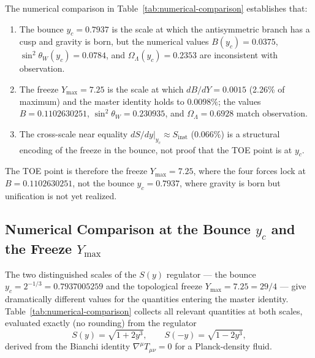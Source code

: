 \documentclass[a4paper,1pt,oneside,openany]{book}
\begin{document}
The numerical comparison in Table~\ref{tab:numerical-comparison} establishes that:
\begin{enumerate}
\item The bounce $y_c = 0.7937$ is the scale at which the antisymmetric branch has a cusp and gravity is born, but the numerical values $B(y_c) = 0.0375$, $\sin^2\theta_W(y_c) = 0.0784$, and $\Omega_\Lambda(y_c) = 0.2353$ are inconsistent with observation.
\item The freeze $Y_{\max} = 7.25$ is the scale at which $dB/dY = 0.0015$ (2.26\% of maximum) and the master identity holds to $0.0098\%$; the values $B = 0.1102630251$, $\sin^2\theta_W = 0.230935$, and $\Omega_\Lambda = 0.6928$ match observation.
\item The cross-scale near equality $dS/dy|_{y_c} \approx S_{\mathrm{inst}}$ (0.066\%) is a structural encoding of the freeze in the bounce, not proof that the TOE point is at $y_c$.
\end{enumerate}
The TOE point is therefore the freeze $Y_{\max} = 7.25$, where the four forces lock at $B = 0.1102630251$, not the bounce $y_c = 0.7937$, where gravity is born but unification is not yet realized.

\subsection{Numerical Comparison at the Bounce $y_c$ and the Freeze $Y_{\max}$}
\label{sec:numerical-comparison-table}

The two distinguished scales of the $S(y)$ regulator — the bounce $y_c = 2^{-1/3} = 0.7937005259$ and the topological freeze $Y_{\max} = 7.25 = 29/4$ — give dramatically different values for the quantities entering the master identity. Table~\ref{tab:numerical-comparison} collects all relevant quantities at both scales, evaluated exactly (no rounding) from the regulator
\begin{equation}
S(y) = \sqrt{1 + 2y^3}, \qquad S(-y) = \sqrt{1 - 2y^3},
\label{eq:S-regulator-compare}
\end{equation}
derived from the Bianchi identity $\nabla^\mu T_{\mu\nu} = 0$ for a Planck-density fluid.
\end{document}
